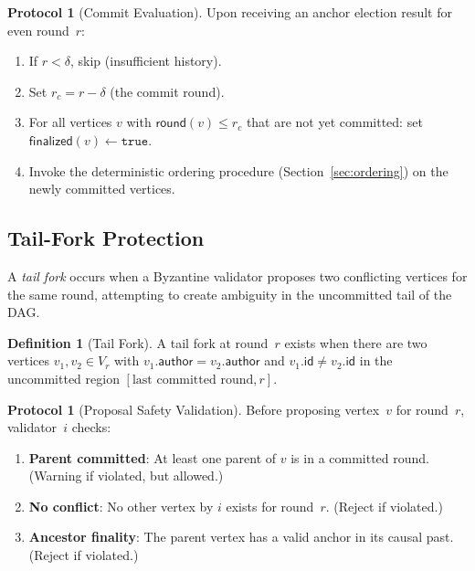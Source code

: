 \documentclass[11pt,a4paper]{article}
\theoremstyle{definition}
\newtheorem{definition}[theorem]{Definition}
\newtheorem{protocol}[theorem]{Protocol}
\theoremstyle{remark}
\newcommand{\round}{\mathsf{round}}
\newcommand{\finalized}{\mathsf{finalized}}
\begin{document}
\begin{protocol}[Commit Evaluation]\label{prot:commit}
Upon receiving an anchor election result for even round~$r$:
\begin{enumerate}[nosep]
  \item If $r < \delta$, skip (insufficient history).
  \item Set $r_c = r - \delta$ (the commit round).
  \item For all vertices $v$ with $\round(v) \leq r_c$ that are not
    yet committed: set $\finalized(v) \leftarrow \texttt{true}$.
  \item Invoke the deterministic ordering procedure
    (Section~\ref{sec:ordering}) on the newly committed vertices.
\end{enumerate}
\end{protocol}

\subsection{Tail-Fork Protection}\label{sec:tail-fork-protocol}

A \emph{tail fork} occurs when a Byzantine validator proposes two
conflicting vertices for the same round, attempting to create ambiguity
in the uncommitted tail of the DAG.

\begin{definition}[Tail Fork]\label{def:tail-fork}
A tail fork at round~$r$ exists when there are two vertices
$v_1, v_2 \in V_r$ with $v_1.\mathsf{author} = v_2.\mathsf{author}$
and $v_1.\mathsf{id} \neq v_2.\mathsf{id}$ in the uncommitted region
$[\text{last committed round}, r]$.
\end{definition}

\begin{protocol}[Proposal Safety Validation]\label{prot:tail-fork}
Before proposing vertex~$v$ for round~$r$, validator~$i$ checks:
\begin{enumerate}[nosep]
  \item \textbf{Parent committed}: At least one parent of $v$ is in
    a committed round. (Warning if violated, but allowed.)
  \item \textbf{No conflict}: No other vertex by $i$ exists for round~$r$.
    (Reject if violated.)
  \item \textbf{Ancestor finality}: The parent vertex has a valid anchor
    in its causal past. (Reject if violated.)
\end{enumerate}
\end{protocol}
\end{document}
